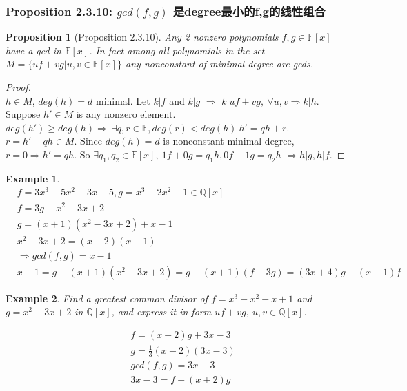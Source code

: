 \documentclass[11pt,a4paper]{article}
\newtheorem{proposition}{Proposition}
\newtheorem{example}{Example}
\begin{document}
\subsubsection{Proposition 2.3.10: $gcd(f,g)$ 是degree最小的f,g的线性组合}
\begin{proposition}[Proposition 2.3.10]
    Any 2 nonzero polynomials $f , g \in \mathbb{F}[x]$ have
    a gcd in $\mathbb{F}[x]$. In fact among all polynomials
    in the set
    $M = \{uf + vg|u, v \in \mathbb{F}[x]\}$
    any nonconstant of minimal degree are gcds.
\end{proposition}
\begin{proof}
\quad\\
$h\in M$, $deg(h)=d$ minimal. Let $k|f$ and $k|g$ $\Rightarrow$ $k|uf+vg,\ \forall u,v\Rightarrow k|h$.\\
Suppose $h'\in M$ is any nonzero element. $deg(h')\geq deg(h)\Rightarrow\ \exists q,r\in\mathbb{F},deg(r)<deg(h)\ h'=qh+r$. $r=h'-qh\in M$. Since $deg(h)=d$ is nonconstant minimal degree, $r=0\Rightarrow h'=qh$. So $\exists q_1,q_2\in\mathbb{F}[x],\ 1f+0g=q_1h, 0f+1g=q_2h$ $\Rightarrow h|g,h|f$.
\end{proof}
\begin{example}
    \begin{equation}
        \begin{aligned}
            &f = 3x^3 - 5x^2 - 3x + 5, g = x^3 − 2x^2 + 1 \in \mathbb{Q}[x]\\
            &f=3g+x^2-3x+2\\
            &g=(x+1)(x^2-3x+2)+x-1\\
            &x^2-3x+2=(x-2)(x-1)\\
            &\Rightarrow gcd(f,g)=x-1\\
            &x-1=g-(x+1)(x^2-3x+2)=g-(x+1)(f-3g)=(3x+4)g-(x+1)f
        \end{aligned}
        \nonumber
    \end{equation}
\end{example}

\begin{example}
    Find a greatest common divisor of $f=x^3-x^2-x+1$ and $g=x^2-3x+2$ in $\mathbb{Q}[x]$, and express it in form $uf+vg,\ u,v\in\mathbb{Q}[x]$.
\end{example}
\begin{equation}
    \begin{aligned}
        &f=(x+2)g+3x-3\\
        &g=\frac{1}{3}(x-2)(3x-3)\\
        &gcd(f,g)=3x-3\\
        &3x-3=f-(x+2)g
    \end{aligned}
    \nonumber
\end{equation}
\end{document}
